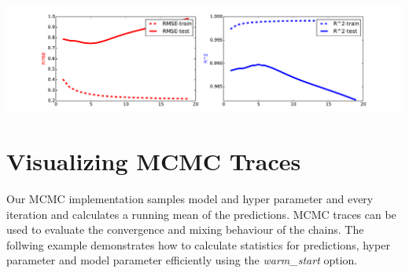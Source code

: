 \documentclass[letterpaper,10pt,english]{sphinxmanual}
\begin{document}
\includegraphics{guide-1.pdf}


\section{Visualizing MCMC Traces}
\label{guide:visualizing-mcmc-traces}
Our MCMC implementation samples model and hyper parameter and every iteration
and calculates a running mean of the predictions. MCMC traces can be used to
evaluate the convergence and mixing behaviour of the chains. The follwing example
demonstrates how to calculate statistics for predictions, hyper parameter and
model parameter efficiently using the \emph{warm\_start} option.
\end{document}
